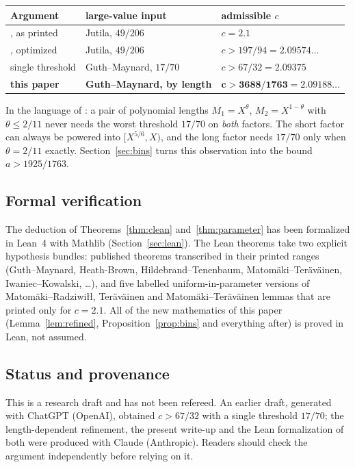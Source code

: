 \documentclass[11pt,a4paper]{amsart}
\theoremstyle{definition}
\newcommand{\1}{\mathbf 1}
\begin{document}
\begin{center}
\small
\begin{tabular}{@{}lll@{}}
\toprule
Argument & large-value input & admissible \(c\)\\
\midrule
\cite[Thm.~1.1]{MT}, as printed & Jutila, \(49/206\) & \(c=2.1\)\\
\cite{MT}, optimized & Jutila, \(49/206\) & \(c>197/94=2.09574\ldots\)\\
single threshold & Guth--Maynard, \(17/70\) & \(c>67/32=2.09375\)\\
\textbf{this paper} & \textbf{Guth--Maynard, by length} & \(\boldsymbol{c>3688/1763=2.09188\ldots}\)\\
\bottomrule
\end{tabular}
\end{center}

\noindent In the language of \cite{MT}: a pair of polynomial lengths
\(M_1=X^\theta\), \(M_2=X^{1-\theta}\) with \(\theta\le2/11\) never
needs the worst threshold \(17/70\) on \emph{both} factors.  The short
factor can always be powered into \([X^{5/6},X)\), and the long factor
needs \(17/70\) only when \(\theta=2/11\) exactly.  Section~\ref{sec:bins}
turns this observation into the bound \(a>1925/1763\).

\subsection*{Formal verification}
The deduction of Theorems~\ref{thm:clean} and~\ref{thm:parameter} has
been formalized in Lean~4 with Mathlib (Section~\ref{sec:lean}).  The
Lean theorems take two explicit hypothesis bundles: published theorems
transcribed in their printed ranges (Guth--Maynard, Heath-Brown,
Hildebrand--Tenenbaum, Matom\"aki--Ter\"av\"ainen, Iwaniec--Kowalski,
\dots), and five labelled uniform-in-parameter versions of
Matom\"aki--Radziwi\l\l, Ter\"av\"ainen and Matom\"aki--Ter\"av\"ainen
lemmas that are printed only for \(c=2.1\).  All of the new mathematics
of this paper (Lemma~\ref{lem:refined}, Proposition~\ref{prop:bins} and
everything after) is proved in Lean, not assumed.

\subsection*{Status and provenance}
This is a research draft and has not been refereed.  An earlier draft,
generated with ChatGPT (OpenAI), obtained \(c>67/32\) with a single
threshold \(17/70\); the length-dependent refinement, the present
write-up and the Lean formalization of both were produced with Claude
(Anthropic).  Readers should check the argument independently before
relying on it.
\end{document}
